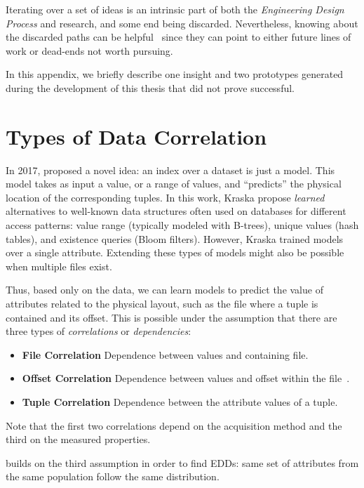 Iterating over a set of ideas is an intrinsic part of both the
\emph{Engineering Design Process} and research, and some end being discarded.
Nevertheless, knowing about the discarded paths can be helpful~\cite{conroy_three_2020}
since they can point to either future lines of work or dead-ends not worth pursuing.

In this appendix, we briefly describe one insight and two prototypes generated during
the development of this thesis that did not prove successful.

\section{Types of Data Correlation}

In 2017, \cite{kraska_case_2018} proposed a novel idea: an index over a dataset
is just a model. This model takes as input a value, or a range of values,
and ``predicts'' the physical location of the corresponding tuples.
In this work, Kraska \etal propose \emph{learned} alternatives to well-known data
structures often used on databases for different access patterns:
value range (typically modeled with B-trees), unique values (hash tables),
and existence queries (Bloom filters).
However, Kraska \etal trained models over a single attribute.
Extending these types of models might also be possible when multiple files exist.

Thus, based only on the data, we can learn models to predict the value of
attributes related to the physical layout, such as the file where a tuple is contained and its offset.
This is possible under the assumption that there are three types of \emph{correlations}
or \emph{dependencies}:

\begin{itemize}
    \item \textbf{File Correlation} Dependence between values and containing file.
    \item \textbf{Offset Correlation} Dependence between values and offset within the
        file~\cite{kraska_case_2018}.
    \item \textbf{Tuple Correlation} Dependence between the attribute values of a tuple.
\end{itemize}

Note that the first two correlations depend on the acquisition method and the third
on the measured properties.

\PresQ builds on the third assumption in order to find \glspl{EDD}: same set of attributes
from the same population follow the same distribution.

